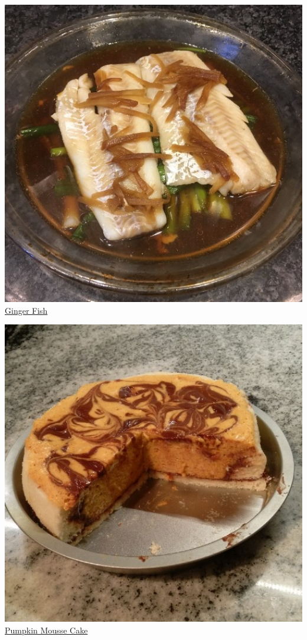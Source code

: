\documentclass[
]{book}
\begin{document}
\protect\hyperlink{gingerfish}{\includegraphics[width=1\textwidth,height=\textheight]{ginger_fish_small.jpg}}
\protect\hyperlink{gingerfish}{Ginger Fish}

\protect\hyperlink{pumpkincake}{\includegraphics[width=1\textwidth,height=\textheight]{pumpkin_mousse_cake_small.jpg}}
\protect\hyperlink{pumpkincake}{Pumpkin Mousse Cake}
\end{document}
